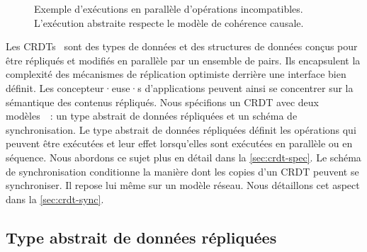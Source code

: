 \begin{figure}[tb]
\centering
{}
\caption[Exécution en parallèle d'opérations incompatibles]{Exemple d'exécutions en parallèle d'opérations incompatibles.
L'exécution abstraite respecte le modèle de cohérence causale.}\label{fig:set-conflict-example}
\end{figure}

Les \acfp{CRDT}~\autocite{shapiro_2011_crdt,roh_2011_rga} sont des types de données et des structures de données conçus pour être répliqués et modifiés en parallèle par un ensemble de pairs.
Ils encapsulent la complexité des mécanismes de réplication optimiste derrière une interface bien définit.
Les concepteur·euse·s d'applications peuvent ainsi se concentrer sur la sémantique des contenus répliqués.
Nous spécifions un \ac{CRDT} avec deux modèles~\autocite{preguia2018_crdt}~: un type abstrait de données répliquées et un schéma de synchronisation.
Le type abstrait de données répliquées définit les opérations qui peuvent être exécutées et leur effet lorsqu'elles sont exécutées en parallèle ou en séquence.
Nous abordons ce sujet plus en détail dans la \autoref{sec:crdt-spec}.
Le schéma de synchronisation conditionne la manière dont les copies d'un \ac{CRDT} peuvent se synchroniser.
Il repose lui même sur un modèle réseau.
Nous détaillons cet aspect dans la \autoref{sec:crdt-sync}.

\subsection{Type abstrait de données répliquées}\label{sec:crdt-spec}


